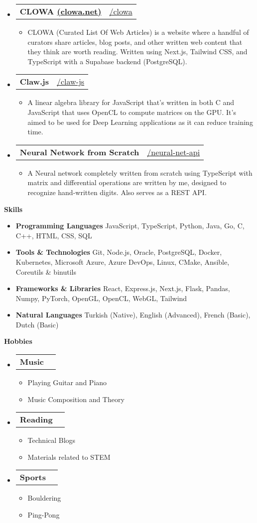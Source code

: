 \documentclass[letterpaper,12pt]{article}[leftmargin=*]
\makeatletter
\def \githubicon {\faGithub}
\def \entryspacing {-0pt}
\renewcommand{\section}[2]{\vspace{5pt}
  \colorbox{secondary}{\color{white}\raggedbottom\normalsize\textbf{{#1}{\hspace{7pt}#2}}}
}
\newcommand{\resumeEntryStart}{\begin{itemize}[leftmargin=2.5mm]}
\newcommand{\resumeEntryEnd}{\end{itemize}\vspace{\entryspacing}}
\newcommand{\resumeItemListStart}{\begin{itemize}[leftmargin=4.5mm]}
\newcommand{\resumeItemListEnd}{\end{itemize}}
\newcommand{\resumeItem}[1]{
  \item\small{
    {#1 \vspace{-2pt}}
  }
}
\newcommand{\resumeEntryTD}[2]{
  \vspace{-1pt}\item[]
    \begin{tabularx}{0.97\textwidth}{X@{\hspace{60pt}}r}
      \textbf{\color{primary}#1} & {\color{accent}\small#2} \\
    \end{tabularx}\vspace{-6pt}
}
\newcommand{\resumeEntryS}[2]{
  \item[]\small{
    \textbf{\color{primary}#1 }{ #2 \vspace{-6pt}}
  }
}
\makeatother
\begin{document}
  \resumeEntryStart
    \resumeEntryTD
      {CLOWA \href{https://clowa.net}{(clowa.net)}}{\githubicon \href{https://github.com/Roi-des-Rats/clowa}{ /clowa}}
    \resumeItemListStart
      \resumeItem {CLOWA (Curated List Of Web Articles) is a website where a handful of curators share articles, blog posts, and other written web content that they think are worth reading. Written using Next.js, Tailwind CSS, and TypeScript with a Supabase backend (PostgreSQL).}
    \resumeItemListEnd
  \resumeEntryEnd

  \resumeEntryStart
    \resumeEntryTD
      {Claw.js}{\githubicon \href{https://github.com/yvesyil/claw-js}{ /claw-js}}
    \resumeItemListStart
      \resumeItem {A linear algebra library for JavaScript that's written in both C and JavaScript that uses OpenCL to compute matrices on the GPU. It's aimed to be used for Deep Learning applications as it can reduce training time.}
    \resumeItemListEnd
  \resumeEntryEnd

  \resumeEntryStart
    \resumeEntryTD
      {Neural Network from Scratch}{\githubicon \href{https://github.com/yvesyil/neural-net-api}{ /neural-net-api}}
    \resumeItemListStart
      \resumeItem {A Neural network completely written from scratch using TypeScript with matrix and differential operations are written by me, designed to recognize hand-written digits. Also serves as a REST API.}
    \resumeItemListEnd
  \resumeEntryEnd

\section{\faGears}{Skills}
  \resumeEntryStart
    \resumeEntryS{Programming Languages} {JavaScript, TypeScript, Python, Java, Go, C, C++, HTML, CSS, SQL}
    \resumeEntryS{Tools \& Technologies} {Git, Node.js, Oracle, PostgreSQL, Docker, Kubernetes, Microsoft Azure, Azure DevOps, Linux, CMake, Ansible, Coreutils \& binutils}
    \resumeEntryS{Frameworks \& Libraries} {React, Express.js, Next.js, Flask, Pandas, Numpy, PyTorch, OpenGL, OpenCL, WebGL, Tailwind}
    \resumeEntryS{Natural Languages} {Turkish (Native), English (Advanced), French (Basic), Dutch (Basic)}
  \resumeEntryEnd

\section{\faHeart}{Hobbies}
  \resumeEntryStart
    \resumeEntryTD{Music}{}
    \resumeItemListStart
      \resumeItem{Playing Guitar and Piano}
      \resumeItem{Music Composition and Theory}
    \resumeItemListEnd
    \resumeEntryTD{Reading}{}
    \resumeItemListStart
      \resumeItem{Technical Blogs}
      \resumeItem{Materials related to STEM}
    \resumeItemListEnd
    \resumeEntryTD{Sports}{}
    \resumeItemListStart
      \resumeItem{Bouldering}
      \resumeItem{Ping-Pong}
    \resumeItemListEnd
  \resumeEntryEnd
\end{document}

